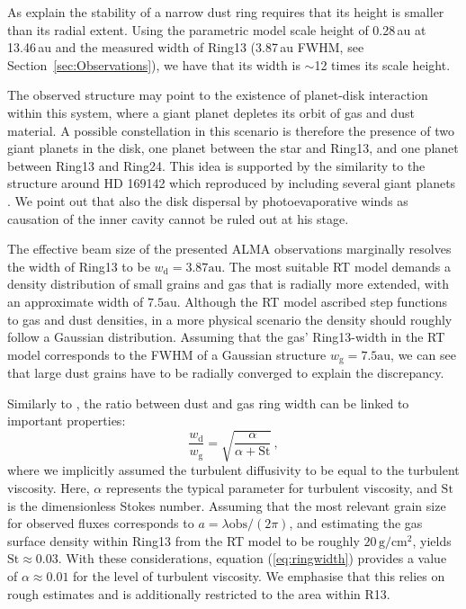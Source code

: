 \documentclass[letters,usenatbib,times]{mnras}
\begin{document}
As \citet{2018ApJ...869L..46D} explain the stability of a narrow dust ring requires that its height is smaller than its radial extent. Using the parametric model scale height of 0.28\,au at 13.46\,au and the measured width of Ring13 (3.87\,au FWHM, see Section~\ref{sec:Observations}), we have that its width is $\sim$12 times its scale height.

The observed structure may point to the existence of planet-disk interaction within this system, where a giant planet depletes its orbit of gas and dust material. A possible constellation in this scenario is therefore the presence of two giant planets in the disk, one planet between the star and Ring13, and one planet between Ring13 and Ring24. This idea is supported by the similarity to the structure around HD 169142 which \citet{bertrang_avenhaus_2018} reproduced by including several giant planets . We point out that also the disk dispersal by photoevaporative winds \citep{1994ApJ...428..654H} as causation of the inner cavity cannot be ruled out at his stage.

The effective beam size of the presented ALMA observations marginally resolves the width of Ring13 to be $w_\mathrm{d} = 3.87\mathrm{au}$. The most suitable RT model demands a density distribution of small grains and gas that is radially more extended, with an approximate width of $7.5\mathrm{au}$. Although the RT model ascribed step functions to gas and dust densities, in a more physical scenario the density should roughly follow a Gaussian distribution. Assuming that the gas' Ring13-width in the RT model corresponds to the FWHM of a Gaussian structure $w_\mathrm{g} = 7.5\mathrm{au}$, we can see that large dust grains have to be radially converged to explain the discrepancy.

Similarly to \citet{2018ApJ...869L..46D}, the ratio between dust and gas ring width can be linked to important properties:
\begin{equation}\label{eq:ringwidth}
        \frac{w_\mathrm{d}}{w_\mathrm{g}} = \sqrt{\frac{\alpha}{\alpha+\mathrm{St}}}\,,
\end{equation}
where we implicitly assumed the turbulent diffusivity to be equal to the turbulent viscosity. Here, $\alpha$ represents the typical parameter for turbulent viscosity, and $\mathrm{St}$ is the dimensionless Stokes number. Assuming that the most relevant grain size for observed fluxes corresponds to $a = \lambda \mathrm{obs}/(2 \pi)$, and estimating the gas surface density within Ring13 from the RT model to be roughly $20\,\mathrm{g}/\mathrm{cm}^2$, yields $\mathrm{St}\approx 0.03$. With these considerations, equation (\ref{eq:ringwidth}) provides a value of $\alpha \approx 0.01$ for the level of turbulent viscosity. We emphasise that this relies on rough estimates and is additionally restricted to the area within R13.
\end{document}
